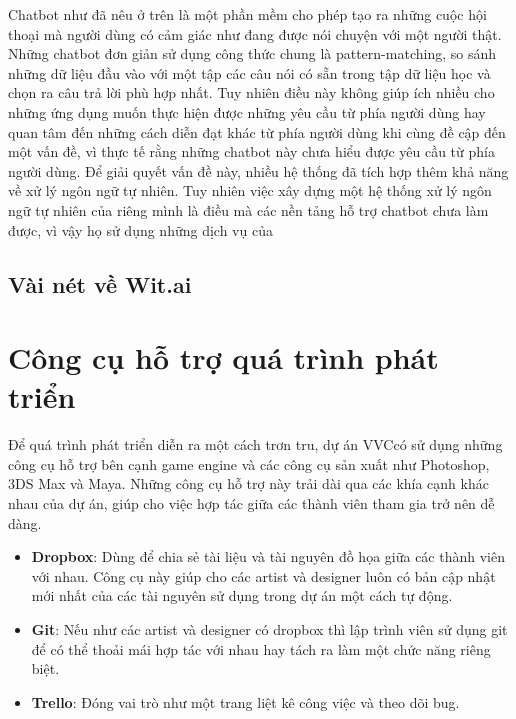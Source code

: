 \documentclass[12pt]{report}
\newcommand{\project}{VVC}
\begin{document}
Chatbot như đã nêu ở trên là một phần mềm cho phép tạo ra những cuộc hội thoại mà người dùng có cảm giác như đang được nói chuyện với một người thật. Những chatbot đơn giản sử dụng công thức chung là pattern-matching, so sánh những dữ liệu đầu vào với một tập các câu nói có sẵn trong tập dữ liệu học và chọn ra câu trả lời phù hợp nhất. Tuy nhiên điều này không giúp ích nhiều cho những ứng dụng muốn thực hiện được những yêu cầu từ phía người dùng hay quan tâm đến những cách diễn đạt khác từ phía người dùng khi cùng đề cập đến một vấn đề, vì thực tế rằng những chatbot này chưa hiểu được yêu cầu từ phía người dùng. Để giải quyết vấn đề này, nhiều hệ thống đã tích hợp thêm khả năng về xử lý ngôn ngữ tự nhiên. Tuy nhiên việc xây dựng một hệ thống xử lý ngôn ngữ tự nhiên của riêng mình là điều mà các nền tảng hỗ trợ chatbot chưa làm được, vì vậy họ sử dụng những dịch vụ của 

\subsection{Vài nét về Wit.ai}



\section{Công cụ hỗ trợ quá trình phát triển}
Để quá trình phát triển diễn ra một cách trơn tru, dự án \project có sử dụng những công cụ hỗ trợ bên cạnh game engine và các công cụ sản xuất như Photoshop, 3DS Max và Maya. Những công cụ hỗ trợ này trải dài qua các khía cạnh khác nhau của dự án, giúp cho việc hợp tác giữa các thành viên tham gia trở nên dễ dàng.
\begin{itemize}
	\item \textbf{Dropbox}: Dùng để chia sẻ tài liệu và tài nguyên đồ họa giữa các thành viên với nhau. Công cụ này giúp cho các artist và designer luôn có bản cập nhật mới nhất của các tài nguyên sử dụng trong dự án một cách tự động.
	\item \textbf{Git}: Nếu như các artist và designer có dropbox thì lập trình viên sử dụng git để có thể thoải mái hợp tác với nhau hay tách ra làm một chức năng riêng biệt.
	\item \textbf{Trello}: Đóng vai trò như một trang liệt kê công việc và theo dõi bug.
\end{itemize}
\end{document}
